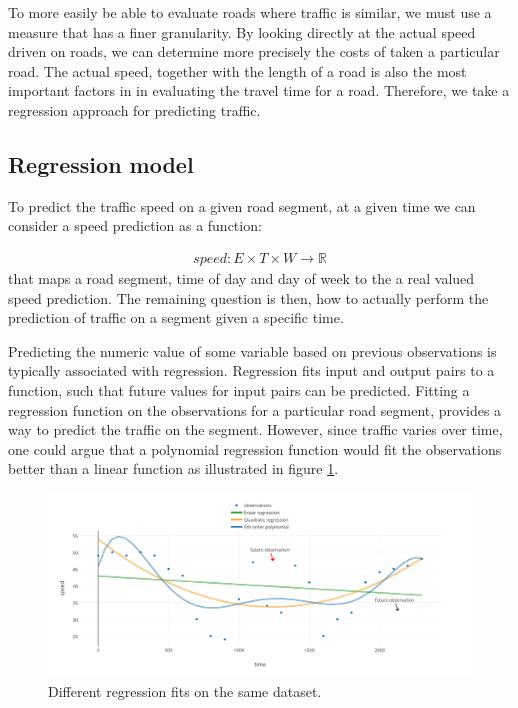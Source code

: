 To more easily be able to evaluate roads where traffic is similar, we must use a measure that has a finer granularity. By looking directly at the actual speed driven on roads, we can determine more precisely the costs of taken a particular road. The actual speed, together with the length of a road is also the most important factors in in evaluating the travel time for a road. Therefore, we take a regression approach for predicting traffic.
\subsection{Regression model}\label{patterns:regression-model}
To predict the traffic speed on a given road segment, at a given time we can consider a speed prediction as a function:

\begin{align}\label{eq:speed}
speed: E \times T \times W \rightarrow \mathbb{R}
\end{align}
that maps a road segment, time of day and day of week to the a real valued speed prediction. The remaining question is then, how to actually perform the prediction of traffic on a segment given a specific time. \par
Predicting the numeric value of some variable based on previous observations is typically associated with regression. Regression fits input and output pairs to a function, such that future values for input pairs can be predicted. Fitting a regression function on the observations for a particular road segment, provides a way to predict the traffic on the segment. However, since traffic varies over time, one could argue that a polynomial regression function would fit the observations better than a linear function as illustrated in figure \ref{fig:compare-regression}.
\begin{figure}
\includegraphics[width=\textwidth]{figures/compare-regression.pdf}
\caption{Different regression fits on the same dataset.}
\label{fig:compare-regression}
\end{figure}
